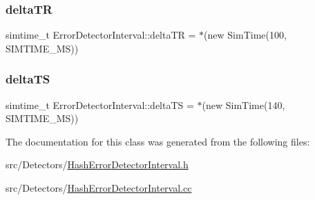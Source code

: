 \mbox{\label{class_error_detector_interval_a24f229a469ae7c4314a948015cddb277}} 
\subsubsection{\texorpdfstring{delta\+TR}{deltaTR}}
{\footnotesize\ttfamily simtime\+\_\+t Error\+Detector\+Interval\+::delta\+TR = $\ast$(new Sim\+Time(100, S\+I\+M\+T\+I\+M\+E\+\_\+\+MS))\hspace{0.3cm}{\ttfamily [private]}}

\mbox{\label{class_error_detector_interval_a2368ba76496cfd25487e150a961bb08b}} 
\subsubsection{\texorpdfstring{delta\+TS}{deltaTS}}
{\footnotesize\ttfamily simtime\+\_\+t Error\+Detector\+Interval\+::delta\+TS = $\ast$(new Sim\+Time(140, S\+I\+M\+T\+I\+M\+E\+\_\+\+MS))\hspace{0.3cm}{\ttfamily [private]}}



The documentation for this class was generated from the following files\+:\begin{DoxyCompactItemize}
\item 
src/\+Detectors/\hyperlink{_hash_error_detector_interval_8h}{Hash\+Error\+Detector\+Interval.\+h}\item 
src/\+Detectors/\hyperlink{_hash_error_detector_interval_8cc}{Hash\+Error\+Detector\+Interval.\+cc}\end{DoxyCompactItemize}

